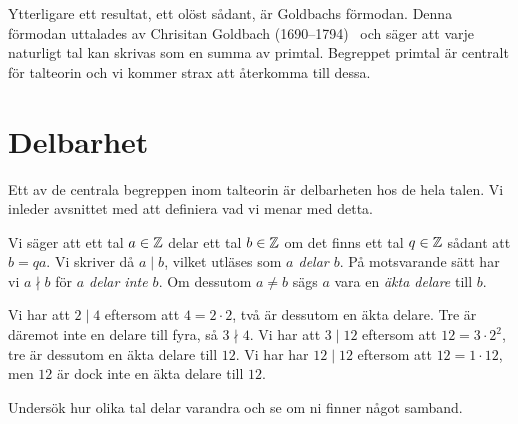 Ytterligare ett resultat, ett olöst sådant, är Goldbachs förmodan.
Denna förmodan uttalades av Chrisitan Goldbach (1690--1794)~\cite{goldbach} och 
säger att varje naturligt tal kan skrivas som en summa av primtal.
Begreppet primtal är centralt för talteorin och vi kommer strax att återkomma 
till dessa.


\section{Delbarhet}
Ett av de centrala begreppen inom talteorin är delbarheten hos de hela 
talen.
Vi inleder avsnittet med att definiera vad vi menar med detta.
\begin{definition}[Delbarhet]
  Vi säger att ett tal \(a\in\mathbb{Z}\) delar ett tal \(b\in\mathbb{Z}\) om det finns ett tal 
  \(q\in\mathbb{Z}\) sådant att \(b = qa\).
  Vi skriver då \(a\mid b\), vilket utläses som \emph{\(a\) delar \(b\)}.
  På motsvarande sätt har vi \(a\nmid b\) för \emph{\(a\) delar inte \(b\)}.
  Om dessutom \(a\neq b\) sägs \(a\) vara en \emph{äkta delare} till \(b\).
\end{definition}
\begin{example}
  Vi har att \(2\mid 4\) eftersom att \(4 = 2\cdot 2\), två är dessutom en äkta 
  delare.
  Tre är däremot inte en delare till fyra, så \(3\nmid 4\).
  Vi har att \(3\mid 12\) eftersom att \(12 = 3\cdot 2^2\), tre är dessutom en 
  äkta delare till \(12\).
  Vi har har \(12\mid 12\) eftersom att \(12 = 1\cdot 12\), men \(12\) är dock 
  inte en äkta delare till \(12\).
\end{example}
\begin{exercise}\label{xrc:delare}
  Undersök hur olika tal delar varandra och se om ni finner något samband.
\end{exercise}

